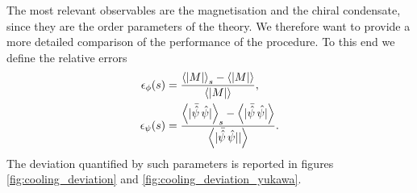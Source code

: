 \newpage
The most relevant observables are the magnetisation and the chiral condensate, since they are the order parameters of the theory. We therefore want to provide a more detailed comparison of the performance of the procedure. To this end we define the relative errors
\begin{equation}
    \begin{aligned}
        \epsilon_\phi(s) &= \frac{\left\langle |M| \right\rangle_{s} - \left\langle |M| \right\rangle}{\left\langle |M| \right\rangle}, \\
        \epsilon_\psi(s) &= \frac{\left\langle |\bar{\hat\psi} \, \hat{\psi}| \right\rangle_{s} - \left\langle |\bar{\hat\psi} \, \hat{\psi|} \right\rangle}{\left\langle |\bar{\hat\psi} \, \hat{\psi}|| \right\rangle}.
    \end{aligned}
    \label{eq:cooling_relative_deviation}
\end{equation}
The deviation quantified by such parameters is reported in figures \ref{fig:cooling_deviation} and \ref{fig:cooling_deviation_yukawa}.
